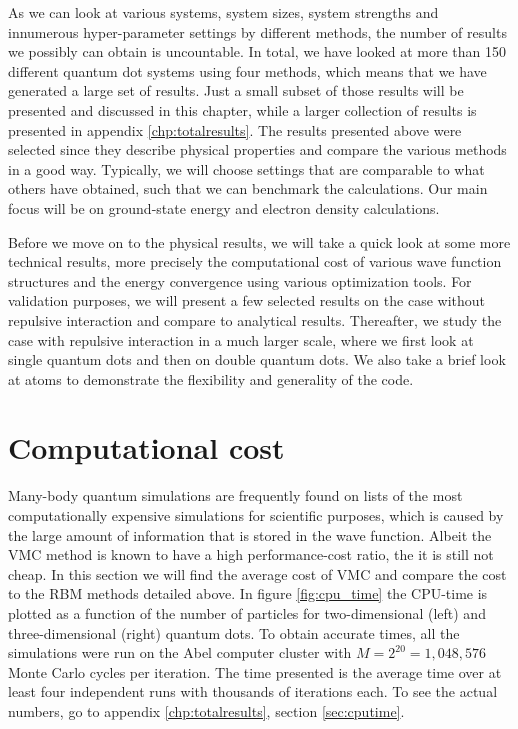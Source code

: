 As we can look at various systems, system sizes, system strengths and innumerous hyper-parameter settings by different methods, the number of results we possibly can obtain is uncountable. In total, we have looked at more than 150 different quantum dot systems using four methods, which means that we have generated a large set of results. Just a small subset of those results will be presented and discussed in this chapter, while a larger collection of results is presented in appendix \ref{chp:totalresults}. The results presented above were selected since they describe physical properties and compare the various methods in a good way. Typically, we will choose settings that are comparable to what others have obtained, such that we can benchmark the calculations. Our main focus will be on ground-state energy and electron density calculations. 

Before we move on to the physical results, we will take a quick look at some more technical results, more precisely the computational cost of various wave function structures and the energy convergence using various optimization tools. For validation purposes, we will present a few selected results on the case without repulsive interaction and compare to analytical results. Thereafter, we study the case with repulsive interaction in a much larger scale, where we first look at single quantum dots and then on double quantum dots. We also take a brief look at atoms to demonstrate the flexibility and generality of the code. 

\section{Computational cost}
Many-body quantum simulations are frequently found on lists of the most computationally expensive simulations for scientific purposes, which is caused by the large amount of information that is stored in the wave function. Albeit the VMC method is known to have a high performance-cost ratio, the it is still not cheap. In this section we will find the average cost of VMC and compare the cost to the RBM methods detailed above. In figure \eqref{fig:cpu_time} the CPU-time is plotted as a function of the number of particles for two-dimensional (left) and three-dimensional (right) quantum dots. To obtain accurate times, all the simulations were run on the Abel computer cluster with $M=2^{20}=1,048,576$ Monte Carlo cycles per iteration. The time presented is the average time over at least four independent runs with thousands of iterations each. To see the actual numbers, go to appendix \ref{chp:totalresults}, section \ref{sec:cputime}. 

